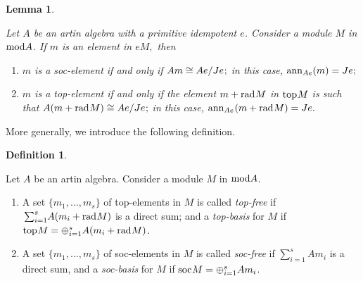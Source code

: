 \documentclass[10pt]{amsart}
\newtheorem{Lemma}[Theo]{Lemma}
\theoremstyle{definition}
\newtheorem{Defn}[Theo]{Definition}
\newcommand{\mmod}{{\rm mod}}
\newcommand{\rad}{{\rm rad}\hspace{.5pt}}
\newcommand{\soc}{{\rm soc}\hspace{.5pt}}
\newcommand{\ntop}{{\rm top}\hspace{.5pt}}
\newcommand{\Ker}{{\rm Ker}}
\newcommand{\hp}{\hspace{.5pt}}
\newcommand{\vp}{\vspace{.5pt}}
\begin{document}
\begin{Lemma}\label{top-element} 

Let $A$ be an artin algebra with a primitive idempotent $e$. Consider a module $M$ in $\mmod A$. If $m$ is an element in $eM,$ then 

\begin{enumerate}[$(1)$]

\vspace{-1.5pt}

\item $m$ is a soc-element if and only if $Am\cong Ae/Je\hp;$ in this case, ${\rm ann}_{Ae}(m)=Je;$

\item $m$ is a top-element if and only if the element $m+\rad M$ in $\ntop M$ is such that $A(m+\rad M)\cong Ae/Je\hp;$ in this case, ${\rm ann}_{Ae}\hp (m+\rad M)=Je.$ 

\end{enumerate} \end{Lemma}

%

\smallskip

More generally, we introduce the following definition.

\begin{Defn}\label{top-basis} 

Let $A$ be an artin algebra. Consider a module $M$ in $\mmod A$.

\begin{enumerate}[$(1)$]

\vspace{-2pt}

\item  A set $\{m_1, \ldots, m_s\}$ \vp of top-elements in $M$ is called {\it top-free} if $\hspace{1pt} \sum_{i=1}^s \hspace{-2pt} A(m_i+\rad M)$ is a direct sum; and  a {\it top-basis} for $M$ if $\ntop M=\oplus_{i=1}^s A(m_i + \rad M)$. 


\item A set $\{m_1, \ldots, m_s\}$ of soc-elements in $M$ is called {\it soc-free} if $\textstyle\sum_{i=1}^s Am_i$ is a direct sum, and a {\it soc-basis} for $M$ if $\soc M=\oplus_{i=1}^s Am_i$. 

\end{enumerate}\end{Defn}
\end{document}
